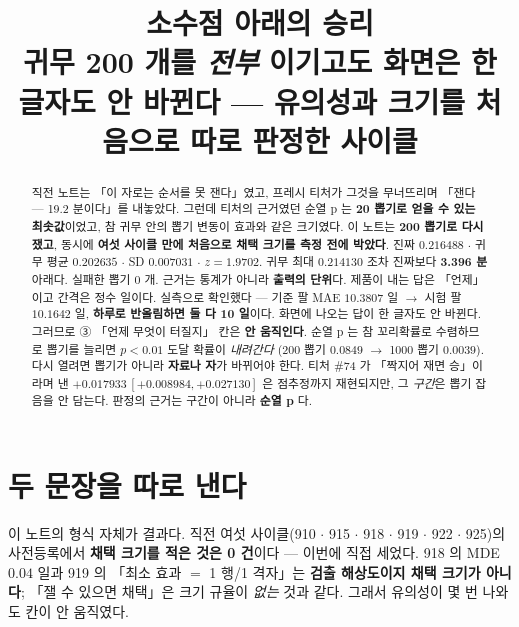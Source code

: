 \documentclass{article}
\title{소수점 아래의 승리 \\
  {\large 귀무 200 개를 \emph{전부} 이기고도 화면은 한 글자도 안 바뀐다 ---
   유의성과 크기를 처음으로 따로 판정한 사이클}}
\begin{document}
\maketitle

\begin{abstract}
직전 노트는 「이 자로는 순서를 못 잰다」였고, 프레시 티처가 그것을 무너뜨리며
「잰다 --- 19.2 분이다」를 내놓았다. 그런데 티처의 근거였던 순열 p 는
\textbf{20 뽑기로 얻을 수 있는 최솟값}이었고, 참 귀무 안의 뽑기 변동이 효과와 같은 크기였다.
이 노트는 \textbf{200 뽑기로 다시 쟀고}, 동시에 \textbf{여섯 사이클 만에 처음으로
채택 크기를 측정 전에 박았다}.
{진짜 $0.216488$ $\cdot$ 귀무 평균 $0.202635$ $\cdot$ SD $0.007031$ $\cdot$ $z=1.9702$.
귀무 최대 $0.214130$ 조차 진짜보다 \textbf{3.396 분} 아래다. 실패한 뽑기 0 개.}
{근거는 통계가 아니라 \textbf{출력의 단위}다. 제품이 내는 답은 「언제」이고 간격은 정수 일이다.
실측으로 확인했다 --- 기준 팔 MAE $10.3807$ 일 $\to$ 시험 팔 $10.1642$ 일,
\textbf{하루로 반올림하면 둘 다 10 일}이다. 화면에 나오는 답이 한 글자도 안 바뀐다.
그러므로 ③ 「언제 무엇이 터질지」 칸은 \textbf{안 움직인다}.}
{순열 p 는 참 꼬리확률로 수렴하므로 뽑기를 늘리면 $p<0.01$ 도달 확률이 \emph{내려간다}
(200 뽑기 $0.0849$ $\to$ 1000 뽑기 $0.0039$). 다시 열려면 뽑기가 아니라
\textbf{자료나 자}가 바뀌어야 한다.}
{티처 \#74 가 「짝지어 재면 승」이라며 낸 $+0.017933\,[+0.008984,+0.027130]$ 은
점추정까지 재현되지만, 그 \emph{구간}은 뽑기 잡음을 안 담는다.
판정의 근거는 구간이 아니라 \textbf{순열 p} 다.}
\end{abstract}

\section{두 문장을 따로 낸다}

이 노트의 형식 자체가 결과다. 직전 여섯 사이클(910 $\cdot$ 915 $\cdot$ 918 $\cdot$ 919 $\cdot$ 922 $\cdot$ 925)의
사전등록에서 \textbf{채택 크기를 적은 것은 0 건}이다 --- 이번에 직접 세었다.
918 의 MDE $0.04$ 일과 919 의 「최소 효과 $=$ 1 행/1 격자」는 \textbf{검출 해상도이지 채택 크기가 아니다};
「잴 수 있으면 채택」은 크기 규율이 \emph{없는} 것과 같다.
그래서 유의성이 몇 번 나와도 칸이 안 움직였다.
\end{document}
